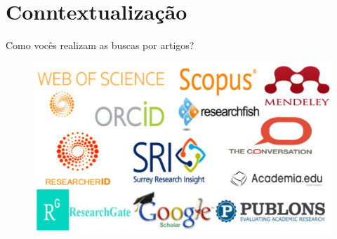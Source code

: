 \section{Conntextualização}
\begin{frame}{Como vocês realizam as buscas por artigos?}
	\centering
	\begin{figure}
		\includegraphics[width=1\textwidth]{figures/databases.jpg}
	\end{figure}
\end{frame}

